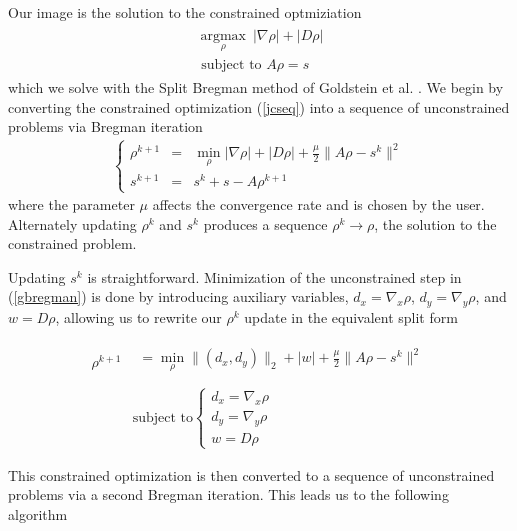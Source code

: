 \documentclass[12pt]{amsart}
\theoremstyle{remark}
\begin{document}
Our image is the solution to the constrained optmiziation
\begin{align}\label{jcseq}
\begin{array}{c}
\underset{\rho}{\operatorname{argmax}} \:  | \nabla \rho| + | D \rho | \\
\text{ subject to } A \rho = s
\end{array}
\end{align}
which we solve with the Split Bregman method of Goldstein et al. \cite{Goldstein2009a}. We begin by converting the constrained optimization (\ref{jcseq}) into a sequence of unconstrained problems via Bregman iteration \cite{Osher} 
\begin{align}\label{gbregman}
\left\{
    \begin{array}{rcl}
\rho^{k+1} &=& \min_\rho | \nabla \rho| + | D \rho | + \frac{\mu}{2} \| A\rho - s^k \|^2 \\
s^{k+1} &=& s^k + s - A\rho^{k+1}
\end{array}
\right.
\end{align}
where the parameter $\mu$ affects the convergence rate and is chosen by the user. Alternately updating $\rho^k$ and $s^k$ produces a sequence $\rho^k \rightarrow \rho$, the solution to the constrained problem.

Updating $s^k$ is straightforward. Minimization of the unconstrained step in (\ref{gbregman}) is done by introducing auxiliary variables, $d_x = \nabla_x \rho$, $d_y = \nabla_y \rho$, and $w = D\rho$, allowing us to rewrite our $\rho^k$ update in the equivalent split form

\begin{align}\label{spilt}
    \rho^{k+1} & \left.\begin{array}{l} = \min_\rho \|(d_x,d_y)\|_2 + | w | + \frac{\mu}{2} \| A\rho - s^k \|^2 \\ \end{array}\right. \\
        & 
\text{subject to} \left\{ \begin{array}{l}
       d_x = \nabla_x \rho  \\
       d_y = \nabla_y \rho  \\
       w = D \rho
    \end{array}\right. 
\end{align}

This constrained optimization is then converted to a sequence of unconstrained problems via a second Bregman iteration. This leads us to the following algorithm
\end{document}
